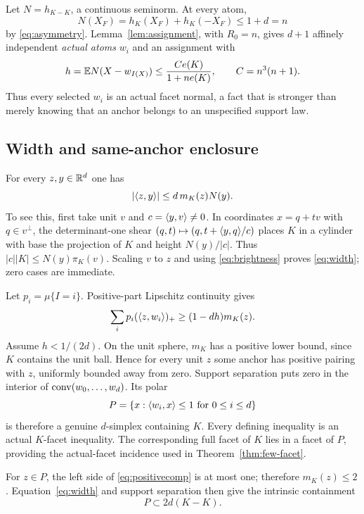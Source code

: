 Let $N=h_{K-K}$, a continuous seminorm. At every atom,
\[
 N(X_F)=h_K(X_F)+h_K(-X_F)\le1+d=n
\]
by \eqref{eq:asymmetry}. Lemma~\ref{lem:assignment}, with $R_0=n$, gives
$d+1$ affinely independent \emph{actual atoms} $w_i$ and an assignment with
\begin{equation}\label{eq:hbudget}
 h=\mathbb E N(X-w_{I(X)})\le
 \frac{Ce(K)}{1+ne(K)},\qquad C=n^3(n+1).
\end{equation}
Thus every selected $w_i$ is an actual facet normal, a fact that is stronger
than merely knowing that an anchor belongs to an unspecified support law.

\subsection{Width and same-anchor enclosure}
For every $z,y\in\mathbb R^d$ one has
\begin{equation}\label{eq:width}
 |\langle z,y\rangle|\le d\,m_K(z)N(y).
\end{equation}
To see this, first take unit $v$ and $c=\langle y,v\rangle\ne0$. In coordinates
$x=q+tv$ with $q\in v^\perp$, the determinant-one shear
$(q,t)\mapsto(q,t+\langle y,q\rangle/c)$ places $K$ in a cylinder with base the
projection of $K$ and height $N(y)/|c|$. Thus
$|c||K|\le N(y)\pi_K(v)$. Scaling $v$ to $z$ and using
\eqref{eq:brightness} proves \eqref{eq:width}; zero cases are immediate.

Let $p_i=\mu\{I=i\}$. Positive-part Lipschitz continuity gives
\begin{equation}\label{eq:positivecomp}
 \sum_i p_i(\langle z,w_i\rangle)_+\ge(1-dh)m_K(z).
\end{equation}
Assume $h<1/(2d)$. On the unit sphere, $m_K$ has a positive lower bound,
since $K$ contains the unit ball. Hence for every unit $z$ some anchor has
positive pairing with $z$, uniformly bounded away from zero. Support
separation puts zero in the interior of $\operatorname{conv}(w_0,\ldots,w_d)$.
Its polar
\begin{equation}\label{eq:outer}
 P=\{x:\langle w_i,x\rangle\le1\text{ for }0\le i\le d\}
\end{equation}
is therefore a genuine $d$-simplex containing $K$. Every defining
inequality is an actual $K$-facet inequality. The corresponding full facet
of $K$ lies in a facet of $P$, providing the actual-facet incidence used in Theorem~\ref{thm:few-facet}.

For $z\in P$, the left side of \eqref{eq:positivecomp} is at most one;
therefore $m_K(z)\le2$. Equation~\eqref{eq:width} and support separation
then give the intrinsic containment
\begin{equation}\label{eq:intrinsiccontain}
 P\subset2d(K-K).
\end{equation}

